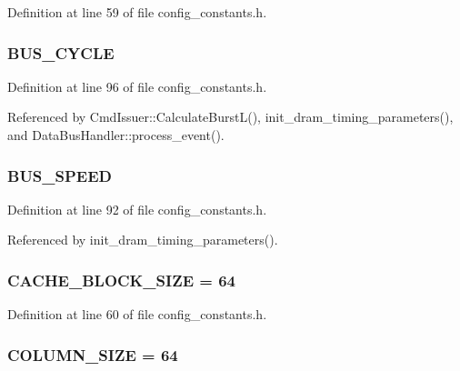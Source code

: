 Definition at line 59 of file config\_\-constants.h.
\subsubsection[{BUS\_\-CYCLE}]{ {\bf BUS\_\-CYCLE}}\label{config__constants_8h_118a88ead6b4377dcda9a070e35df8b4}




Definition at line 96 of file config\_\-constants.h.

Referenced by CmdIssuer::CalculateBurstL(), init\_\-dram\_\-timing\_\-parameters(), and DataBusHandler::process\_\-event().
\subsubsection[{BUS\_\-SPEED}]{ {\bf BUS\_\-SPEED}}\label{config__constants_8h_90658998db7134b26708c557c42693ef}




Definition at line 92 of file config\_\-constants.h.

Referenced by init\_\-dram\_\-timing\_\-parameters().
\subsubsection[{CACHE\_\-BLOCK\_\-SIZE}]{ {\bf CACHE\_\-BLOCK\_\-SIZE} = 64}\label{config__constants_8h_c8931ee7117c23e5d56b04ecd0defe7f}




Definition at line 60 of file config\_\-constants.h.
\subsubsection[{COLUMN\_\-SIZE}]{ {\bf COLUMN\_\-SIZE} = 64}\label{config__constants_8h_f0596ae8862443e137eb225092bffad6}




